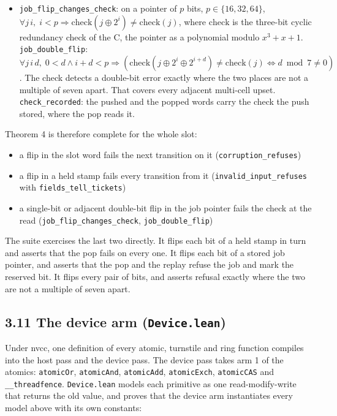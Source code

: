 \begin{itemize}
\item \texttt{job\_\allowbreak{}flip\_\allowbreak{}changes\_\allowbreak{}check}: on a pointer of \(p\) bits, \(p \in \{16, 32, 64\}\), \(\forall j\, i,\; i < p \Rightarrow \mathrm{check}(j \oplus 2^{i}) \neq \mathrm{check}(j)\), where \(\mathrm{check}\) is the three-bit cyclic redundancy check of the C, the pointer as a polynomial modulo \(x^{3} + x + 1\). \texttt{job\_\allowbreak{}double\_\allowbreak{}flip}: \(\forall j\, i\, d,\; 0 < d \land i + d < p \Rightarrow (\mathrm{check}(j \oplus 2^{i} \oplus 2^{i+d}) \neq \mathrm{check}(j) \iff d \bmod 7 \neq 0)\). The check detects a double-bit error exactly where the two places are not a multiple of seven apart. That covers every adjacent multi-cell upset. \texttt{check\_\allowbreak{}recorded}: the pushed and the popped words carry the check the push stored, where the pop reads it.
\end{itemize}

Theorem 4 is therefore complete for the whole slot:

\begin{itemize}
\item a flip in the slot word fails the next transition on it (\texttt{corruption\_\allowbreak{}refuses})
\item a flip in a held stamp fails every transition from it (\texttt{invalid\_\allowbreak{}input\_\allowbreak{}refuses} with \texttt{fields\_\allowbreak{}tell\_\allowbreak{}tickets})
\item a single-bit or adjacent double-bit flip in the job pointer fails the check at the read (\texttt{job\_\allowbreak{}flip\_\allowbreak{}changes\_\allowbreak{}check}, \texttt{job\_\allowbreak{}double\_\allowbreak{}flip})
\end{itemize}

The suite exercises the last two directly. It flips each bit of a held stamp in turn and asserts that the pop fails on every one. It flips each bit of a stored job pointer, and asserts that the pop and the replay refuse the job and mark the reserved bit. It flips every pair of bits, and asserts refusal exactly where the two are not a multiple of seven apart.

\subsection{\texorpdfstring{3.11 The device arm (\texttt{Device.\allowbreak{}lean})}{3.11 The device arm (Device.lean)}}

Under nvcc, one definition of every atomic, turnstile and ring function compiles into the host pass and the device pass. The device pass takes arm 1 of the atomics: \texttt{atomic\allowbreak{}Or}, \texttt{atomic\allowbreak{}And}, \texttt{atomic\allowbreak{}Add}, \texttt{atomic\allowbreak{}Exch}, \texttt{atomic\allowbreak{}CAS} and \texttt{\_\allowbreak{}\_\allowbreak{}threadfence}. \texttt{Device.\allowbreak{}lean} models each primitive as one read-modify-write that returns the old value, and proves that the device arm instantiates every model above with its own constants:

